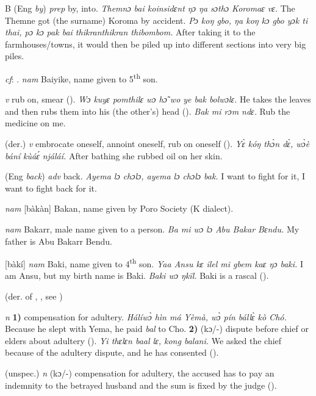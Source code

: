 \begin{letter}{B}
 (Eng \textit{by}) \textit{prep} by, into. \textit{Themnɔ bai koinsidɛnt ŋɔ ŋa sɔthɔ Koromaɛ vɛ.} The Themne got (the surname) Koroma by accident. \textit{Pɔ koŋ gbo, ŋa koŋ kɔ gbo yɔk ti thai, pɔ kɔ pak bai thikranthikran thibombom.} After taking it to the farmhouses/towns, it would then be piled up into different sections into very big piles.

 \textit{cf}: . \textit{nam} Baiyike, name given to 5\textsuperscript{th} son.

 \textit{v} rub on, smear (\citealt{Sumner1921}). \textit{Wɔ kuyɛ pomthilɛ wɔ hɔ̃ wo ye bak bolwɔlɛ.} He takes the leaves and then rubs them into his (the other's) head (\citealt{Pichl1967}). \textit{Bak mi rɔm ndɛ.} Rub the medicine on me.

 (der.) \textit{v} embrocate oneself, annoint oneself, rub on oneself (\citealt{Pichl1967}). \textit{Yɛ̀ kóŋ thɔ̀n dɛ̀, wɔ̀è bání kùáɛ́ njáláí.} After bathing she rubbed oil on her skin.

 (Eng \textit{back}) \textit{adv} back. \textit{Ayema lɔ chɔlɔ, ayema lɔ chɔlɔ bak.} I want to fight for it, I want to fight back for it. 

 \textit{nam} [bàkàn] Bakan, name given by Poro Society (K dialect).

 \textit{nam} Bakarr, male name given to a person. \textit{Ba mi wɔ lɔ Abu Bakar Bɛndu.} My father is Abu Bakarr Bendu.

 [bàkí] \textit{nam} Baki, name given to 4\textsuperscript{th} son. \textit{Yaa Ansu kɛ ilel mi gbem kaɛ ŋɔ baki.} I am Ansu, but my birth name is Baki. \textit{Baki wɔ ŋkïl.} Baki is a rascal (\citealt{Pichl1967}).

 (der. of , , see ) 

 \textit{n} \textbf{1)} compensation for adultery. \textit{Hálíwɔ̀ hìn má Yèmà, wɔ̀ pín bállɛ̀ kò Chó.} Because he slept with Yema, he paid \textit{bal} to Cho. \textbf{2)} (kɔ/-) dispute before chief or elders about adultery (\citealt{Pichl1967}). \textit{Yi thɛlɛn baal lɛ, kong balani.} We asked the chief because of the adultery dispute, and he has consented (\citealt{Pichl1967}).

 (unspec.) \textit{n} (kɔ/-) compensation for adultery, the accused has to pay an indemnity to the betrayed husband and the sum is fixed by the judge (\citealt{Pichl1967}). 


\end{letter}
